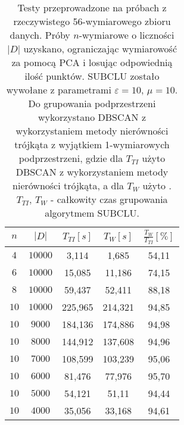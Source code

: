 \begin{table}
	\centering
	\begin{tabular}{| c | c | c | c | c |}
		\hline
		$ n $ & $ |D| $ & $ T_{TI} [s]$ & $ T_{W} [s]$ & $ \frac{T_{W}}{T_{TI}} [\%] $ \\ \hline
		$ 4 $  & $ 10000 $	& 3,114 	& 1,685    & 54,11 \\ \hline
		$ 6 $  & $ 10000 $	& 15,085 	& 11,186   & 74,15 \\ \hline
		$ 8 $  & $ 10000 $	& 59,437 	& 52,411 	 & 88,18 \\ \hline
		$ 10 $ & $ 10000 $  & 225,965 & 214,321  & 94,85 \\ \hline
		$ 10 $ & $ 9000 $ 	& 184,136 & 174,886  & 94,98 \\ \hline
		$ 10 $ & $ 8000 $ 	& 144,912 & 137,608  & 94,96 \\ \hline
		$ 10 $ & $ 7000 $ 	& 108,599 & 103,239  & 95,06 \\ \hline
		$ 10 $ & $ 6000 $ 	& 81,476 	& 77,976 	 & 95,70 \\ \hline
		$ 10 $ & $ 5000 $ 	& 54,121 	& 51,11 	 & 94,44 \\ \hline
		$ 10 $ & $ 4000 $ 	& 35,056 	& 33,168 	 & 94,61 \\ \hline




	\end{tabular}
	\caption{Testy przeprowadzone na próbach z rzeczywistego 56-wymiarowego zbioru danych. Próby $ n $-wymiarowe o liczności $ |D| $ uzyskano, ograniczając wymiarowość za pomocą PCA i losując odpowiednią ilość punktów. SUBCLU zostało wywołane z parametrami $ \varepsilon=10 $, $ \mu=10 $. Do grupowania podprzestrzeni wykorzystano DBSCAN z wykorzystaniem metody nierówności trójkąta z wyjątkiem 1-wymiarowych podprzestrzeni, gdzie dla $ T_{TI} $ użyto DBSCAN z wykorzystaniem metody nierówności trójkąta, a dla $ T_{W} $ użyto . $ T_{TI},\,T_{W} $ - całkowity czas grupowania algorytmem SUBCLU.}\label{odc:real-test}
\end{table} 